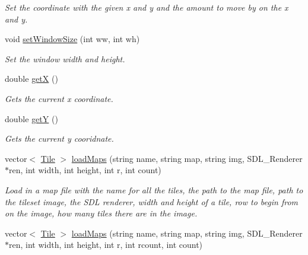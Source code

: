 \begin{DoxyCompactItemize}
\begin{DoxyCompactList}\small\item\em Set the coordinate with the given x and y and the amount to move by on the x and y. \end{DoxyCompactList}\item 
void \hyperlink{classTileset_a138b26fa4cb2241a8c9a5e58327a6f6c}{set\+Window\+Size} (int ww, int wh)\hypertarget{classTileset_a138b26fa4cb2241a8c9a5e58327a6f6c}{}\label{classTileset_a138b26fa4cb2241a8c9a5e58327a6f6c}

\begin{DoxyCompactList}\small\item\em Set the window width and height. \end{DoxyCompactList}\item 
double \hyperlink{classTileset_a1c2c75bb6d7c130158487d7f438e4dd1}{getX} ()\hypertarget{classTileset_a1c2c75bb6d7c130158487d7f438e4dd1}{}\label{classTileset_a1c2c75bb6d7c130158487d7f438e4dd1}

\begin{DoxyCompactList}\small\item\em Gets the current x coordinate. \end{DoxyCompactList}\item 
double \hyperlink{classTileset_a6f15c38bfae4739e932fa58e30bfba4c}{getY} ()\hypertarget{classTileset_a6f15c38bfae4739e932fa58e30bfba4c}{}\label{classTileset_a6f15c38bfae4739e932fa58e30bfba4c}

\begin{DoxyCompactList}\small\item\em Gets the current y cooridnate. \end{DoxyCompactList}\item 
vector$<$ \hyperlink{classTile}{Tile} $>$ \hyperlink{classTileset_ae10b6721f116102fff75d3ad5eea6ae0}{load\+Maps} (string name, string map, string img, S\+D\+L\+\_\+\+Renderer $\ast$ren, int width, int height, int r, int count)\hypertarget{classTileset_ae10b6721f116102fff75d3ad5eea6ae0}{}\label{classTileset_ae10b6721f116102fff75d3ad5eea6ae0}

\begin{DoxyCompactList}\small\item\em Load in a map file with the name for all the tiles, the path to the map file, path to the tileset image, the S\+DL renderer, width and height of a tile, row to begin from on the image, how many tiles there are in the image. \end{DoxyCompactList}\item 
vector$<$ \hyperlink{classTile}{Tile} $>$ \hyperlink{classTileset_a7896a6a2c52ff570854ea4aaa9ca6503}{load\+Maps} (string name, string map, string img, S\+D\+L\+\_\+\+Renderer $\ast$ren, int width, int height, int r, int rcount, int count)\hypertarget{classTileset_a7896a6a2c52ff570854ea4aaa9ca6503}{}\label{classTileset_a7896a6a2c52ff570854ea4aaa9ca6503}


\end{DoxyCompactItemize}
